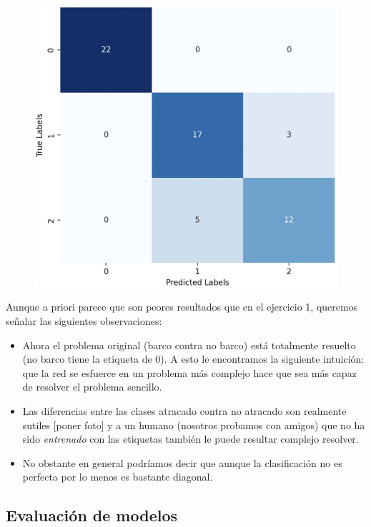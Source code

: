 \documentclass{article}
\begin{document}
\begin{figure}
	\includegraphics[width=1\linewidth]{cmEj2} 
	\label{fig:cmEj2}
\end{figure}

Aunque a priori parece que son peores resultados que en el ejercicio 1, queremos señalar las siguientes observaciones:

\begin{itemize}
	\item Ahora el problema original (barco contra no barco) está totalmente resuelto (no barco tiene la etiqueta de 0). A esto le encontramos la siguiente intuición: que la red se esfuerce en un problema más complejo hace que sea más capaz de resolver el problema sencillo.
	\item Las diferencias entre las clases atracado contra no atracado son realmente sutiles [poner foto] y a un humano (nosotros probamos con amigos) que no ha sido \emph{entrenado} con las etiquetas también le puede resultar complejo resolver.
	\item No obstante en general podríamos decir que aunque la clasificación no es perfecta por lo menos es bastante diagonal.
\end{itemize}

\subsection*{Evaluación de modelos}
\end{document}

